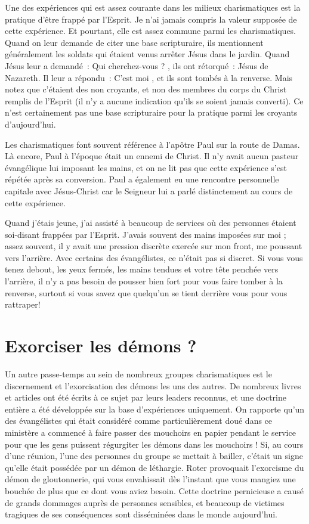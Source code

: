 Une des expériences qui est assez courante dans les milieux charismatiques
 est la pratique d'être \og frappé par l'Esprit. \fg{}
 Je n'ai jamais compris la valeur supposée de cette expérience.
 Et pourtant, elle est assez commune parmi les charismatiques.
 Quand on leur demande de citer une base scripturaire,
 ils mentionnent généralement les soldats qui étaient venus arrêter
 Jésus dans le jardin. Quand Jésus leur a demandé~:
 \og Qui cherchez-vous ? \fg{}, ils ont rétorqué~:
 \og Jésus de Nazareth. \fg{} Il leur a répondu~:
 \og C'est moi \fg{}, et ils sont tombés à la renverse.
 Mais notez que c'étaient des non croyants, et non des membres
 du corps du Christ remplis de l'Esprit (il n'y a aucune indication
 qu'ils se soient jamais converti). Ce n'est certainement pas une base
 scripturaire pour la pratique parmi les croyants d'aujourd'hui.

Les charismatiques font souvent référence à l'apôtre Paul sur la route
 de Damas. Là encore, Paul à l'époque était un ennemi de Christ.
 Il n'y avait aucun pasteur évangélique lui imposant les mains,
 et on ne lit pas que cette expérience s'est répétée après sa conversion.
 Paul a également eu une rencontre personnelle capitale avec Jésus-Christ
 car le Seigneur lui a parlé distinctement au cours de cette expérience.

Quand j'étais jeune, j'ai assisté à beaucoup de services où des personnes
 étaient soi-disant frappées par l'Esprit.
 J'avais souvent des mains imposées sur moi ; assez souvent,
 il y avait une pression discrète exercée sur mon front,
 me poussant vers l'arrière. Avec certains des évangélistes,
 ce n'était pas si discret. Si vous vous tenez debout, les yeux fermés,
 les mains tendues et votre tête penchée vers l'arrière,
 il n'y a pas besoin de pousser bien fort pour vous faire tomber
 à la renverse, surtout si vous savez que quelqu'un se tient derrière
 vous pour vous rattraper!


\section{Exorciser les d\'emons ?}

Un autre passe-temps au sein de nombreux groupes charismatiques
 est le discernement et l'exorcisation des démons les uns des autres.
 De nombreux livres et articles ont été écrits à ce sujet par leurs leaders
 reconnus, et une doctrine entière a été développée sur la base d'expériences
 uniquement. On rapporte qu'un des évangélistes qui était considéré
 comme particulièrement doué dans ce ministère a commencé à faire passer
 des mouchoirs en papier pendant le service pour que les gens puissent
 régurgiter les démons dans les mouchoirs ! Si, au cours d'une réunion,
 l'une des personnes du groupe se mettait à bailler, c'était un signe
 qu'elle était possédée par un démon de léthargie. Roter provoquait
 l'exorcisme du démon de gloutonnerie, qui vous envahissait dès l'instant
 que vous mangiez une bouchée de plus que ce dont vous aviez besoin.
 Cette doctrine pernicieuse a causé de grands dommages auprès de personnes
 sensibles, et beaucoup de victimes tragiques de ses conséquences
 sont disséminées dans le monde aujourd'hui.


